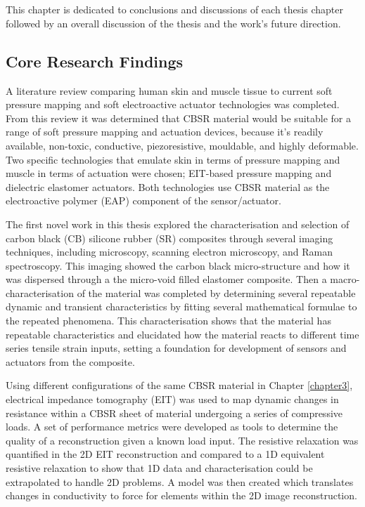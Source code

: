 \chapter{\chapviiiname}
\label{chapter8}
 This chapter is dedicated to conclusions and discussions of each thesis chapter followed by an overall discussion of the thesis and the work's future direction.



\section{Core Research Findings}
A literature review comparing human skin and muscle tissue to current soft pressure mapping and soft electroactive actuator technologies was completed. From this review it was determined that CBSR material would be suitable for a range of soft pressure mapping and actuation devices, because it's readily available, non-toxic, conductive, piezoresistive, mouldable, and highly deformable. Two specific technologies that emulate skin in terms of pressure mapping and muscle in terms of actuation were chosen; EIT-based pressure mapping and dielectric elastomer actuators. Both technologies use CBSR material as the electroactive polymer (EAP) component of the sensor/actuator.

The first novel work in this thesis explored the characterisation and selection of carbon black (CB) silicone rubber (SR) composites through several imaging techniques, including microscopy, scanning electron microscopy, and Raman spectroscopy. This imaging showed the carbon black micro-structure and how it was dispersed through a the micro-void filled elastomer composite. Then a macro-characterisation of the material was completed by determining several repeatable dynamic and transient characteristics by fitting several mathematical formulae to the repeated phenomena. This characterisation shows that the material has repeatable characteristics and elucidated how the material reacts to different time series tensile strain inputs, setting a foundation for development of sensors and actuators from the composite.

Using different configurations of the same CBSR material in Chapter \ref{chapter3}, electrical impedance tomography (EIT) was used to map dynamic changes in resistance within a CBSR sheet of material undergoing a series of compressive loads. A set of performance metrics were developed as tools to determine the quality of a reconstruction given a known load input. The resistive relaxation was quantified in the 2D EIT reconstruction and compared to a 1D equivalent resistive relaxation to show that 1D data and characterisation could be extrapolated to handle 2D problems. A model was then created which translates changes in conductivity to force for elements within the 2D image reconstruction. 

